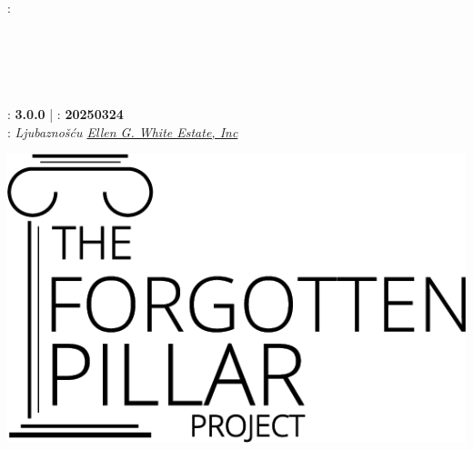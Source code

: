 \clearpage %

{\small
\setlength{\parindent}{0em}\setlength{\parskip}{0.75em}

{\large \emcap{\booktitle}}

\ifx\originaltitle\undefined\else\if\relax\detokenize\expandafter{\originaltitle}\relax{} \\ \fi\fi
{}: \textbf{\authorname} \\
\ifx\editor\undefined\else\if\relax\detokenize\expandafter{\editor}\relax{} \\ \fi\fi
\ifx\translatedby\undefined\else\if\relax\detokenize\expandafter{\translatedby}\relax{} \\ \fi\fi
\ifx\publisher\undefined\else\if\relax\detokenize\expandafter{\publisher}\relax{} \\ \fi\fi
\ifx\publishingplace\undefined\else\if\relax\detokenize\expandafter{\publishingplace}\relax{} \\ \fi\fi
\ifx\isbn\undefined\else\if\relax\detokenize\expandafter{\isbn}\relax{} \\ \fi\fi
{}: \textbf{3.0.0} | : \textbf{20250324} \\
: \textit{Ljubaznošću \href{https://ellenwhite.org/}{Ellen G. White Estate, Inc}}

\vfill

{\licensesize \licensetext}

\ifepub
    \includegraphics[width=\linewidth]{images/logo-black.png}

}
